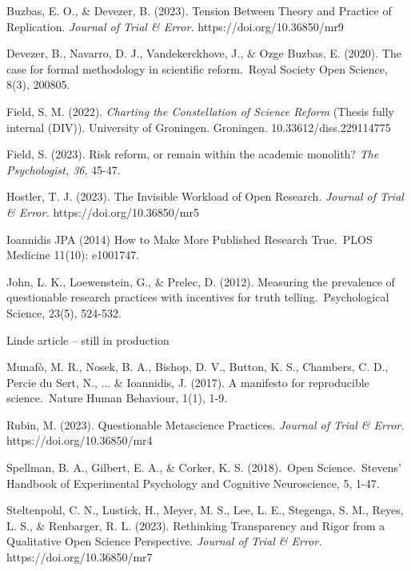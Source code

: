 \documentclass[authordate, editorial,noabstract]{jote-new-article}
\begin{document}
	Buzbas, E. O., \& Devezer, B. (2023). Tension Between Theory and Practice of Replication. \emph{Journal of Trial \& Error.} https://doi.org/10.36850/mr9



	Devezer, B., Navarro, D. J., Vandekerckhove, J., \& Ozge Buzbas, E. (2020). The case for formal methodology in scientific reform. Royal Society Open Science, 8(3), 200805.



	Field, S. M. (2022). \emph{Charting the Constellation of Science Reform} (Thesis fully internal (DIV)). University of Groningen. Groningen. 10.33612/diss.229114775



	Field, S. (2023). Risk reform, or remain within the academic monolith? \emph{The Psychologist, 36}, 45-47.



	Hostler, T. J. (2023). The Invisible Workload of Open Research. \emph{Journal of Trial \& Error.} https://doi.org/10.36850/mr5



	Ioannidis JPA (2014) How to Make More Published Research True. PLOS Medicine 11(10): e1001747.



	John, L. K., Loewenstein, G., \& Prelec, D. (2012). Measuring the prevalence of questionable research practices with incentives for truth telling. Psychological Science, 23(5), 524-532.



	Linde article -- still in production



	Munafò, M. R., Nosek, B. A., Bishop, D. V., Button, K. S., Chambers, C. D., Percie du Sert, N., ... \& Ioannidis, J. (2017). A manifesto for reproducible science. Nature Human Behaviour, 1(1), 1-9.



	Rubin, M. (2023). Questionable Metascience Practices. \emph{Journal of Trial \& Error.} https://doi.org/10.36850/mr4



	Spellman, B. A., Gilbert, E. A., \& Corker, K. S. (2018). Open Science. Stevens' Handbook of Experimental Psychology and Cognitive Neuroscience, 5, 1-47.



	 Steltenpohl, C. N., Lustick, H., Meyer, M. S., Lee, L. E., Stegenga, S. M., Reyes, L. S., \& Renbarger, R. L. (2023). Rethinking Transparency and Rigor from a Qualitative Open Science Perspective. \emph{Journal of Trial \& Error.} https://doi.org/10.36850/mr7
\end{document}
